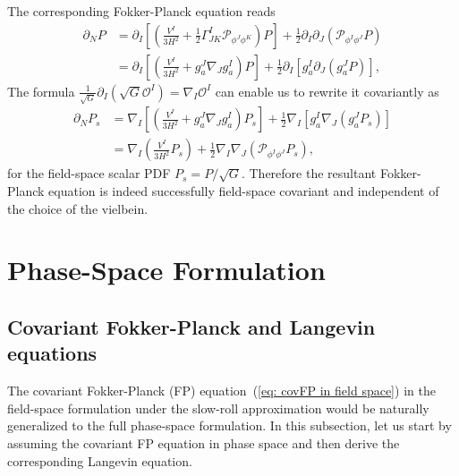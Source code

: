 \documentclass[aps, prd
, preprint
, nofootinbib 
, notitlepage
, longbibliography
]{revtex4-1}
\newcommand{\calO}{\mathcal{O}}
\newcommand{\calP}{\mathcal{P}}
\newcommand{\bae}[1]{\begin{align} #1 \end{align}}
\begin{document}
The corresponding Fokker-Planck equation reads
\bae{
    \partial_NP&=\partial_I\left[\left(\frac{V^I}{3H^2}+\frac{1}{2}\Gamma^I_{JK}\calP_{\phi^J\phi^K}\right)P\right]+\frac{1}{2}\partial_I\partial_J(\calP_{\phi^I\phi^J}P) \nonumber \\
    &=\partial_I\left[\left(\frac{V^I}{3H^2}+g_a^J\nabla_Jg^I_a\right)P\right]+\frac{1}{2}\partial_I\left[g^I_a\partial_J(g^J_aP)\right],
}
The formula $\frac{1}{\sqrt{G}}\partial_I(\sqrt{G}\calO^I)=\nabla_I\calO^I$ can enable us to rewrite it covariantly as
\bae{\label{eq: covFP in field space}
    \partial_NP_s&=\nabla_I\left[\left(\frac{V^I}{3H^2}+g^J_a\nabla_Jg^I_a\right)P_s\right]+\frac{1}{2}\nabla_I\left[g^I_a\nabla_J(g^J_aP_s)\right] \nonumber \\
    &=\nabla_I\left(\frac{V^I}{3H^2}P_s\right)+\frac{1}{2}\nabla_I\nabla_J(\calP_{\phi^I\phi^J}P_s),
}
for the field-space scalar PDF $P_s=P/\sqrt{G}$. Therefore the resultant Fokker-Planck equation is indeed 
successfully field-space covariant and independent of the choice of the vielbein.




\section{Phase-Space Formulation}

\subsection{Covariant Fokker-Planck and Langevin equations}

The covariant Fokker-Planck (FP) equation~(\ref{eq: covFP in field space}) in the field-space formulation under the slow-roll approximation
would be naturally generalized to the full phase-space formulation.
In this subsection, let us start by assuming the covariant FP equation in phase space and then derive the corresponding Langevin equation.
\end{document}
